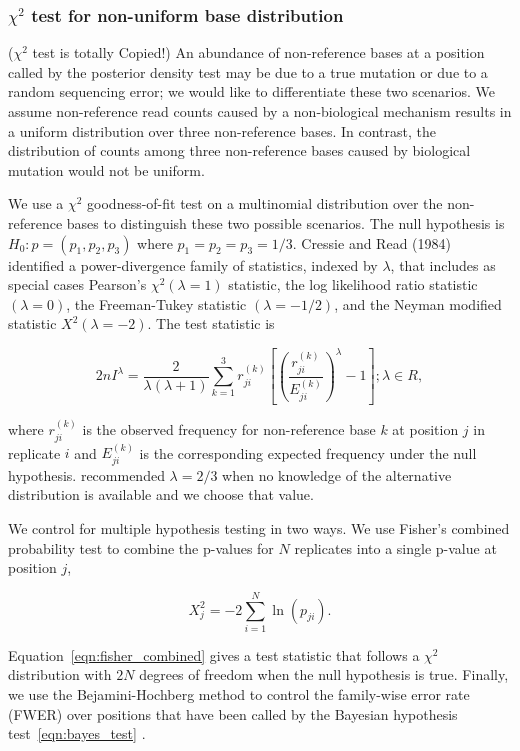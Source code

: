 \documentclass{bioinfo}
\begin{document}
\subsubsection{$\chi^2$ test for non-uniform base distribution}
($\chi^2$ test is totally Copied!)
An abundance of non-reference bases at a position called by the posterior density test may be due to a true mutation or due to a random sequencing error;
we would like to differentiate these two scenarios. We assume non-reference read counts caused by a non-biological mechanism results in a uniform distribution over three non-reference bases.
In contrast, the distribution of counts among three non-reference bases caused by biological mutation would not be uniform.

We use a $\chi^2$ goodness-of-fit test on a multinomial distribution over the non-reference bases to distinguish these two possible scenarios.
The null hypothesis is $H_0: p = (p_1, p_2, p_3)$ where $p_1=p_2=p_3=1/3$.
Cressie and Read (1984) identified a power-divergence family of statistics, indexed by $\lambda$,
that includes as special cases Pearson's $\chi^2 (\lambda = 1)$ statistic, the log likelihood ratio statistic $(\lambda = 0)$, the Freeman-Tukey statistic $(\lambda = -1/2)$, and the Neyman modified statistic $X^2 (\lambda = -2)$.
The test statistic is

\begin{equation}
 2nI^\lambda = \frac{2}{\lambda(\lambda+1)}\sum_{k=1}^3 r_{ji}^{(k)} \left[\left(\frac{r_{ji}^{(k)}}{E_{ji}^{(k)}}\right)^\lambda-1\right];\lambda \in R,
\end{equation}

where $r_{ji}^{(k)}$ is the observed frequency for non-reference base $k$ at position $j$ in replicate $i$ and $E_{ji}^{(k)}$ is the corresponding expected frequency under the null hypothesis.
 \citet{cressie1984multinomial} recommended $\lambda = 2/3$ when no knowledge of the alternative distribution is available and we choose that value.

We control for multiple hypothesis testing in two ways. We use Fisher's combined probability test \citep{fisher1970statistical} to combine the p-values for $N$ replicates into a single p-value at position $j$,

\begin{equation}\label{eqn:fisher_combined}
	X_j^2 = -2 \sum_{i=1}^N \ln(p_{ji}).
\end{equation}

Equation~\eqref{eqn:fisher_combined} gives a test statistic that follows a $\chi^2$ distribution with $2N$ degrees of freedom when the null hypothesis is true.
Finally, we use the Bejamini-Hochberg method to control the family-wise error rate (FWER) over positions that have been called by the Bayesian hypothesis test~\eqref{eqn:bayes_test} \citep{benjamini1995controlling, efron2010large}.
\end{document}
